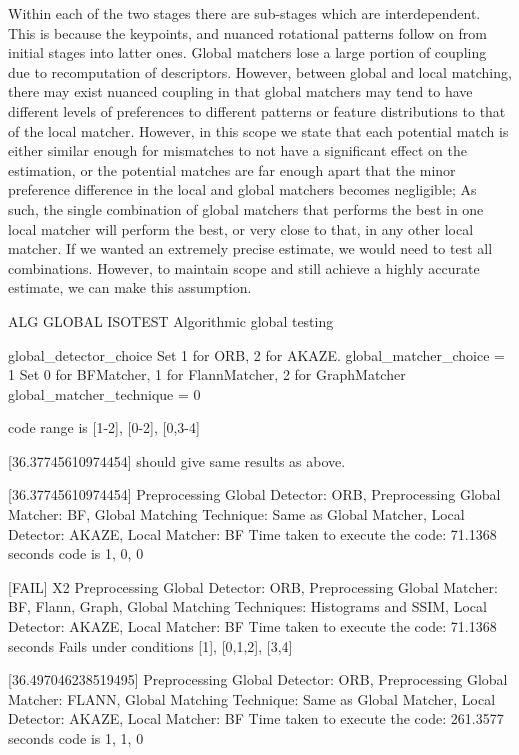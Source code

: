 Within each of the two stages there are sub-stages which are interdependent. This is because the keypoints, and nuanced rotational patterns follow on from initial stages into latter ones. Global matchers lose a large portion of coupling due to recomputation of descriptors. However, between global and local matching, there may exist nuanced coupling in that global matchers may tend to have different levels of preferences to different patterns or feature distributions to that of the local matcher. However, in this scope we state that each potential match is either similar enough for mismatches to not have a significant effect on the estimation, or the potential matches are far enough apart that the minor preference difference in the local and global matchers becomes negligible; As such, the single combination of global matchers that performs the best in one local matcher will perform the best, or very close to that, in any other local matcher. If we wanted an extremely precise estimate, we would need to test all combinations. However, to maintain scope and still achieve a highly accurate estimate, we can make this assumption.






ALG GLOBAL ISOTEST
Algorithmic global testing 

global\_detector\_choice Set 1 for ORB, 2 for AKAZE. 
    global\_matcher\_choice = 1 Set 0 for BFMatcher, 1 for FlannMatcher, 2 for GraphMatcher
    global\_matcher\_technique = 0 

code range is [1-2], [0-2], [0,3-4]

[36.37745610974454]
should give same results as above. 

[36.37745610974454]
Preprocessing Global Detector: ORB, Preprocessing Global Matcher: BF, Global Matching Technique: Same as Global Matcher, Local Detector: AKAZE, Local Matcher: BF
Time taken to execute the code: 71.1368 seconds
code is 1, 0, 0



[FAIL] X2
Preprocessing Global Detector: ORB, Preprocessing Global Matcher: BF, Flann, Graph, Global Matching Techniques: Histograms and SSIM, Local Detector: AKAZE, Local Matcher: BF
Time taken to execute the code: 71.1368 seconds
Fails under conditions [1], [0,1,2], [3,4]


[36.497046238519495]
Preprocessing Global Detector: ORB, Preprocessing Global Matcher: FLANN, Global Matching Technique: Same as Global Matcher, Local Detector: AKAZE, Local Matcher: BF
Time taken to execute the code: 261.3577 seconds
code is 1, 1, 0


